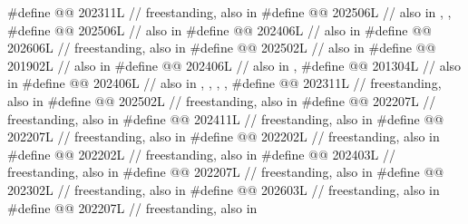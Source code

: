 \begin{codeblock}
#define @@                           202311L // freestanding, also in 
#define @@                202506L
  // also in , , 
#define @@                202506L // also in 
#define @@                     202406L // also in 
#define @@                  202606L // freestanding, also in 
#define @@                       202502L // also in 
#define @@             201902L // also in 
#define @@                             202406L // also in , 
#define @@                  201304L // also in 
#define @@                            202406L
  // also in , , , , 
#define @@                   202311L // freestanding, also in 
#define @@                   202502L // freestanding, also in 
#define @@                  202207L // freestanding, also in 
#define @@               202411L // freestanding, also in 
#define @@          202207L // freestanding, also in 
#define @@                      202202L // freestanding, also in 
#define @@                   202202L // freestanding, also in 
#define @@                     202403L // freestanding, also in 
#define @@                   202207L // freestanding, also in 
#define @@                  202302L // freestanding, also in 
#define @@                     202603L // freestanding, also in 
#define @@                  202207L // freestanding, also in 

\end{codeblock}
